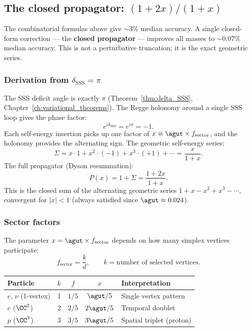\subsection{The closed propagator: $(1+2x)/(1+x)$}
\label{sec:closed_propagator}

The combinatorial formulas above give $\sim 3\%$ median accuracy.  A single closed-form correction --- the \textbf{closed propagator} --- improves all masses to $\sim 0.07\%$ median accuracy.  This is not a perturbative truncation; it is the exact geometric series.

\subsubsection{Derivation from $\delta_\mathrm{SSS} = \pi$}

The SSS deficit angle is exactly $\pi$ (Theorem~\ref{thm:delta_SSS}, Chapter~\ref{ch:variational_theorems}).  The Regge holonomy around a single SSS loop gives the phase factor:
\begin{equation}
e^{i\delta_\mathrm{SSS}} = e^{i\pi} = -1.
\end{equation}
Each self-energy insertion picks up one factor of $x \equiv \agut \times f_\mathrm{sector}$, and the holonomy provides the alternating sign.  The geometric self-energy series:
\begin{equation}
\Sigma = x \cdot 1 + x^2 \cdot (-1) + x^3 \cdot (+1) + \cdots = \frac{x}{1 + x}.
\end{equation}
The full propagator (Dyson resummation):
\begin{equation}
\label{eq:closed_propagator}
\boxed{P(x) = 1 + \Sigma = \frac{1 + 2x}{1 + x}.}
\end{equation}
This is the closed sum of the alternating geometric series $1 + x - x^2 + x^3 - \cdots$, convergent for $|x| < 1$ (always satisfied since $\agut \approx 0.024$).

\subsubsection{Sector factors}

The parameter $x = \agut \times f_\mathrm{sector}$ depends on how many simplex vertices participate:
\begin{equation}
f_\mathrm{sector} = \frac{k}{d}, \qquad k = \text{number of selected vertices.}
\end{equation}
\begin{center}
\begin{tabular}{lcccl}
\hline
Particle & $k$ & $f$ & $x$ & Interpretation \\
\hline
$e$, $\nu$ (1-vertex) & 1 & $1/5$ & $\agut/5$ & Single vertex pattern \\
$e$ ($\CC^2$) & 2 & $2/5$ & $2\agut/5$ & Temporal doublet \\
$p$ ($\CC^3$) & 3 & $3/5$ & $3\agut/5$ & Spatial triplet (proton) \\
\hline
\end{tabular}
\end{center}

